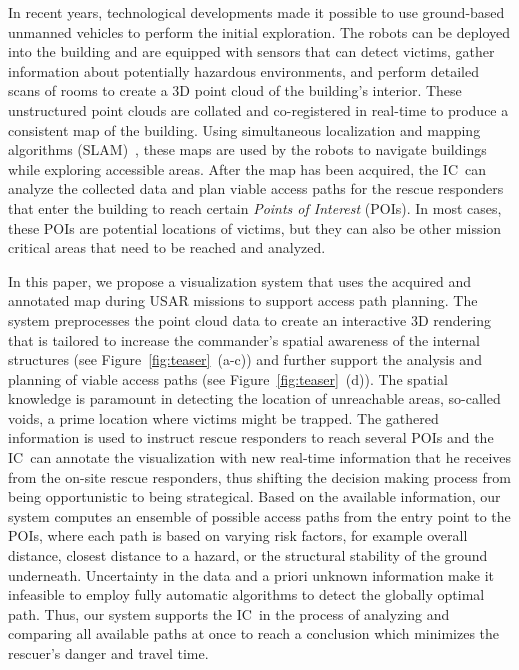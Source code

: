 \documentclass[review,journal]{vgtc}         %
\def\IC{IC}
\begin{document}
In recent years, technological developments made it possible to use ground-based unmanned vehicles to perform the initial exploration. The robots can be deployed into the building and are equipped with sensors that can detect victims, gather information about potentially hazardous environments, and perform detailed scans of rooms to create a 3D point cloud of the building's interior. These unstructured point clouds are collated and co-registered in real-time to produce a consistent map of the building. Using simultaneous localization and mapping algorithms (SLAM)~\cite{Dissanayake01asolution, Ziparo459917}, these maps are used by the robots to navigate buildings while exploring accessible areas. After the map has been acquired, the \IC\ can analyze the collected data and plan viable access paths for the rescue responders that enter the building to reach certain \emph{Points of Interest} (POIs). In most cases, these POIs are potential locations of victims, but they can also be other mission critical areas that need to be reached and analyzed.

In this paper, we propose a visualization system that uses the acquired and annotated map during USAR missions to support access path planning. The system preprocesses the point cloud data to create an interactive 3D rendering that is tailored to increase the commander's spatial awareness of the internal structures (see Figure~\ref{fig:teaser}~(a-c)) and further support the analysis and planning of viable access paths (see Figure~\ref{fig:teaser}~(d)). The spatial knowledge is paramount in detecting the location of unreachable areas, so-called voids, a prime location where victims might be trapped. The gathered information is used to instruct rescue responders to reach several POIs and the \IC\ can annotate the visualization with new real-time information that he receives from the on-site rescue responders, thus shifting the decision making process from being opportunistic to being strategical. Based on the available information, our system computes an ensemble of possible access paths from the entry point to the POIs, where each path is based on varying risk factors, for example overall distance, closest distance to a hazard, or the structural stability of the ground underneath. Uncertainty in the data and a priori unknown information make it infeasible to employ fully automatic algorithms to detect the globally optimal path. Thus, our system supports the \IC\ in the process of analyzing and comparing all available paths at once to reach a conclusion which minimizes the rescuer's danger and travel time.
\end{document}
